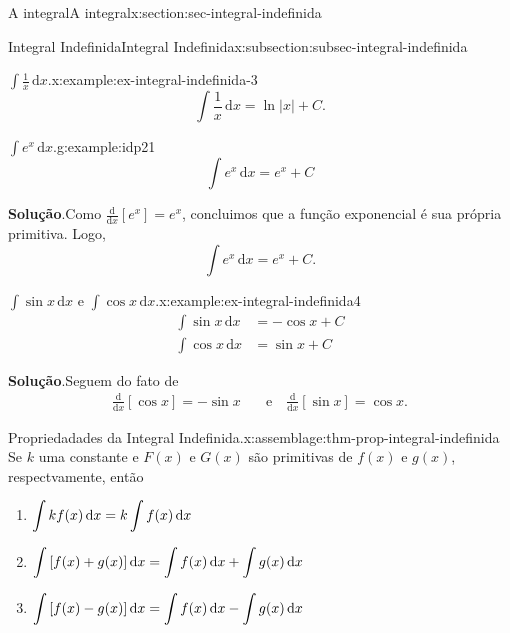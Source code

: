 \documentclass[oneside,10pt,]{article}
\newcommand{\blocktitlefont}{\relax}
\numberwithin{equation}{section}
\newcommand{\dd}{\mathrm{d}}
\newcommand{\integral}[2]{\displaystyle\int {#1}\,\dd {#2}}
\newcommand{\amp}{&}
\begin{document}
\begin{sectionptx}{A integral}{}{A integral}{}{}{x:section:sec-integral-indefinida}
\begin{subsectionptx}{Integral Indefinida}{}{Integral Indefinida}{}{}{x:subsection:subsec-integral-indefinida}
\begin{example}{\(\integral{\frac{1}{x}}{x}\).}{x:example:ex-integral-indefinida-3}
\begin{equation*}
\integral{\frac{1}{x}}{x} = \ln{|x|} + C\text{.}
\end{equation*}
%
\end{example}
\begin{example}{\(\integral{e^x}{x}\).}{g:example:idp21}%
%
\begin{equation*}
\integral{e^x}{x}=e^x + C 
\end{equation*}
%
\par\smallskip%
\noindent\textbf{\blocktitlefont Solução}.\hypertarget{g:solution:idp22}{}\quad{}Como \(\frac{\dd }{\dd x}[e^x]=e^x\), concluimos que a função exponencial é sua própria primitiva. Logo,%
\begin{equation*}
\integral{e^x}{x}= e^x + C.
\end{equation*}
%
\end{example}
\begin{example}{\(\integral{\sin{x}}{x}\) e \(\integral{\cos{x}}{x}\).}{x:example:ex-integral-indefinida4}%
%
\begin{align*}
\integral{\sin{x}}{x}\amp =-\cos{x}+C\\
\integral{\cos{x}}{x} \amp=\sin{x}+C 
\end{align*}
%
\par\smallskip%
\noindent\textbf{\blocktitlefont Solução}.\hypertarget{g:solution:idp23}{}\quad{}Seguem do fato de%
\begin{align*}
\frac{\dd }{\dd x}[\cos{x}]=-\sin{x} \amp \quad  \text{e} \quad \frac{\dd }{\dd x}[\sin{x}]=\cos{x}\text{.}
\end{align*}
%
\end{example}
\begin{assemblage}{Propriedadades da Integral Indefinida.}{x:assemblage:thm-prop-integral-indefinida}%
Se  \(k\) uma constante e \(F(x)\) e \(G(x)\) são primitivas de \(f(x)\) e \(g(x)\), respectvamente, então%
\begin{enumerate}[label=\Roman*)]
\item\hypertarget{x:li:thm-prop-integral-indefinida-a}{}\(\displaystyle \small{\integral{kf(x)}{x}=k\integral{f(x)}{x}}\)%
\item\hypertarget{x:li:thm-prop-integral-indefinida-b}{}\(\displaystyle \small{\integral{\left[ f(x) + g(x)\right]}{x}=\integral{f(x)}{x} + \integral{g(x)}{x}}\)%
\item\hypertarget{x:li:thm-prop-integral-indefinida-c}{}\(\displaystyle \small{\integral{\left[f(x) - g(x)\right]}{x}=\integral{f(x)}{x} - \integral{g(x)}{x}}\)%

\end{enumerate}
\end{assemblage}
\end{subsectionptx}
\end{sectionptx}
\end{document}
